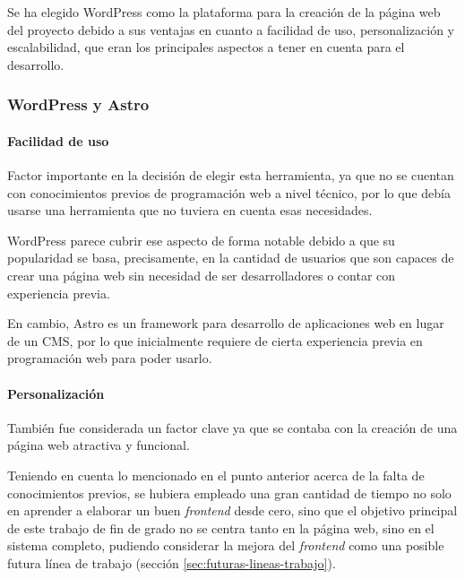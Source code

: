             Se ha elegido WordPress como la plataforma para la creación de la página web del proyecto debido a sus ventajas en cuanto a facilidad de uso, personalización y escalabilidad, que eran los principales aspectos a tener en cuenta para el desarrollo.
            
            \subsubsection{WordPress y Astro}

                \paragraph{Facilidad de uso}
                    
                    Factor importante en la decisión de elegir esta herramienta, ya que no se cuentan con conocimientos previos de programación web a nivel técnico, por lo que debía usarse una herramienta que no tuviera en cuenta esas necesidades.
                    
                    WordPress parece cubrir ese aspecto de forma notable debido a que su popularidad se basa, precisamente, en la cantidad de usuarios que son capaces de crear una página web sin necesidad de ser desarrolladores o contar con experiencia previa.

                    En cambio, Astro \cite{astro} es un framework para desarrollo de aplicaciones web en lugar de un CMS, por lo que inicialmente requiere de cierta experiencia previa en programación web para poder usarlo.
                
                \paragraph{Personalización}
                
                    También fue considerada un factor clave ya que se contaba con la creación de una página web atractiva y funcional.
                    
                    Teniendo en cuenta lo mencionado en el punto anterior acerca de la falta de conocimientos previos, se hubiera empleado una gran cantidad de tiempo no solo en aprender a elaborar un buen \textit{frontend} desde cero, sino que el objetivo principal de este trabajo de fin de grado no se centra tanto en la página web, sino en el sistema completo, pudiendo considerar la mejora del \textit{frontend} como una posible futura línea de trabajo (sección \ref{sec:futuras-lineas-trabajo}).
                
